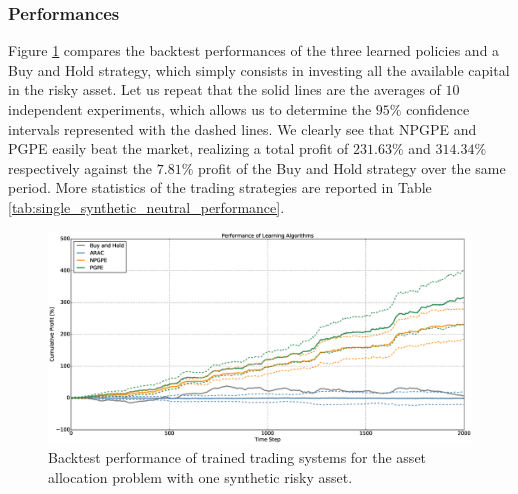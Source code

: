 \subsubsection{Performances}
Figure \ref{fig:single_synthetic_neutral_performance} compares the backtest performances of the three learned policies and a Buy and Hold strategy, which simply consists in investing all the available capital in the risky asset. Let us repeat that the solid lines are the averages of $10$ independent experiments, which allows us to determine the $95\%$ confidence intervals represented with the dashed lines. We clearly see that NPGPE and PGPE easily beat the market, realizing a total profit of $231.63\%$ and $314.34\%$ respectively against the $7.81\%$ profit of the Buy and Hold strategy over the same period. More statistics of the trading strategies are reported in Table \ref{tab:single_synthetic_neutral_performance}. 
\begin{figure}[t]
	\centering
	\includegraphics[width=1.0\textwidth]{Images/6_1_single_synthetic_neutral_performance}
	\caption[Backtest performance with one synthetic risky asset]{Backtest performance of trained trading systems for the asset allocation problem with one synthetic risky asset.}
	\label{fig:single_synthetic_neutral_performance}
\end{figure}
